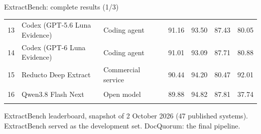 \documentclass[aspectratio=169,10pt]{beamer}
\newcommand{\src}[1]{\par\vfill{\tiny\color{muted}#1\par}}
\begin{document}
\begin{frame}{ExtractBench: complete results (1/3)}
\begin{tabularx}{\textwidth}{@{}rYl@{\hspace{6pt}}lrrrr@{}}
13 & Codex (GPT-5.6 Luna Evidence) & {\color{routeD}Coding agent} & \textcolor{routeD!45}{\rule{1.09cm}{1.05ex}} & 91.16 & 93.50 & 87.43 & 80.05\\
14 & Codex (GPT-6 Luna Evidence) & {\color{routeD}Coding agent} & \textcolor{routeD!45}{\rule{1.09cm}{1.05ex}} & 91.01 & 93.09 & 87.71 & 80.88\\
15 & Reducto Deep Extract & {\color{routeB}Commercial service} & \textcolor{routeB!45}{\rule{1.09cm}{1.05ex}} & 90.44 & 94.20 & 80.47 & 92.01\\
16 & Qwen3.8 Flash Next & {\color{good}Open model} & \textcolor{good!45}{\rule{1.08cm}{1.05ex}} & 89.88 & 94.82 & 87.81 & 37.74\\
\bottomrule\end{tabularx}\endgroup

\src{ExtractBench leaderboard, snapshot of 2 October 2026 (47 published systems). ExtractBench served as the development set. DocQuorum: the final pipeline.}
\end{frame}
\end{document}
